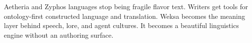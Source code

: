 \ProjectionBand
{Aetheria and Zyphos languages stop being fragile flavor text.}
{Writers get tools for ontology-first constructed language and translation.}
{Weksa becomes the meaning layer behind speech, lore, and agent cultures.}
{It becomes a beautiful linguistics engine without an authoring surface.}

